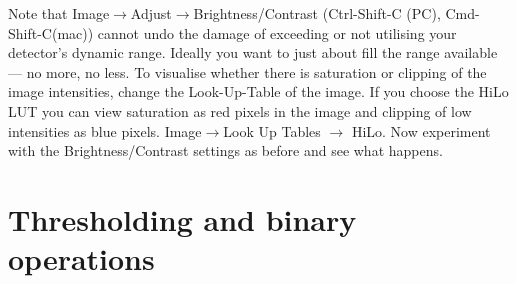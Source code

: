 \documentclass[a4paper,oneside,article]{memoir}
\begin{document}
\begin{enumerate}[(a)]
      Note that Image$\rightarrow$Adjust$\rightarrow$Brightness/Contrast
      (Ctrl-Shift-C (PC), Cmd-Shift-C(mac)) cannot undo the damage of
      exceeding or not utilising your detector's dynamic range. Ideally
      you want to just about fill the range available --- no more, no
      less. To visualise whether there is saturation or clipping of the
      image intensities, change the Look-Up-Table of the image. If you
      choose the HiLo LUT you can view saturation as red pixels in the
      image and clipping of low intensities as blue pixels.
      Image$\rightarrow$Look Up Tables $\rightarrow$ HiLo. Now
      experiment with the Brightness/Contrast settings as before and
      see what happens.
    \end{enumerate}

  \chapter{Thresholding and binary operations}
    \label{sec:threshold}
\end{document}
